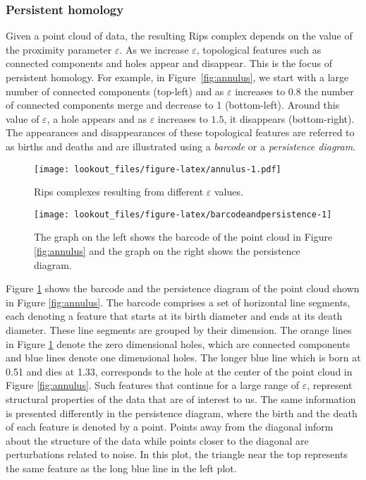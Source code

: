 \documentclass[
]{article}
\begin{document}
\hypertarget{persistent-homology}{%
\subsubsection*{Persistent homology}\label{persistent-homology}}

Given a point cloud of data, the resulting Rips complex depends on the
value of the proximity parameter \(\varepsilon\). As we increase
\(\varepsilon\), topological features such as connected components and
holes appear and disappear. This is the focus of persistent homology.
For example, in Figure~\ref{fig:annulus}, we start with a large number
of connected components (top-left) and as \(\varepsilon\) increases to
\(0.8\) the number of connected components merge and decrease to 1
(bottom-left). Around this value of \(\varepsilon\), a hole appears and
as \(\varepsilon\) increases to \(1.5\), it disappears (bottom-right).
The appearances and disappearances of these topological features are
referred to as births and deaths and are illustrated using a
\emph{barcode} or a \emph{persistence diagram}.

\begin{figure}
\centering
\texttt{[image: lookout\_files/figure-latex/annulus-1.pdf]}
\caption{Rips complexes resulting from different \(\varepsilon\)
values.}
\end{figure}

\begin{figure}
\texttt{[image: lookout\_files/figure-latex/barcodeandpersistence-1]} \caption{The graph on the left shows the barcode of the point cloud in Figure \ref{fig:annulus} and the graph on the right shows the persistence diagram.}\label{fig:barcodeandpersistence}
\end{figure}

Figure \ref{fig:barcodeandpersistence} shows the barcode and the
persistence diagram of the point cloud shown in Figure
\ref{fig:annulus}. The barcode comprises a set of horizontal line
segments, each denoting a feature that starts at its birth diameter and
ends at its death diameter. These line segments are grouped by their
dimension. The orange lines in Figure \ref{fig:barcodeandpersistence}
denote the zero dimensional holes, which are connected components and
blue lines denote one dimensional holes. The longer blue line which is
born at 0.51 and dies at 1.33, corresponds to the hole at the center of
the point cloud in Figure \ref{fig:annulus}. Such features that continue
for a large range of \(\varepsilon\), represent structural properties of
the data that are of interest to us. The same information is presented
differently in the persistence diagram, where the birth and the death of
each feature is denoted by a point. Points away from the diagonal inform
about the structure of the data while points closer to the diagonal are
perturbations related to noise. In this plot, the triangle near the top
represents the same feature as the long blue line in the left plot.
\end{document}
